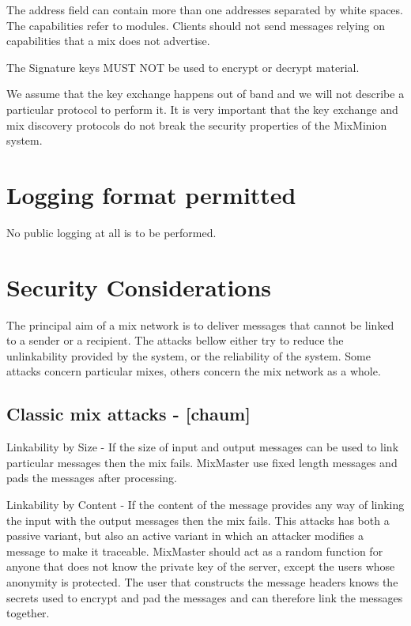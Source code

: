 \documentclass{article}
\begin{document}
The address field can contain more than one addresses separated by
white spaces. The capabilities refer to modules. Clients should not 
send messages relying on capabilities that a mix does not advertise.

The Signature keys MUST NOT be used to encrypt or decrypt material.

We assume that the key exchange happens out of band and we will not
describe a particular protocol to perform it. It is very important
that the key exchange and mix discovery protocols do not break the
security properties of the MixMinion system.

\section{Logging format permitted}

No public logging at all is to be performed.

\section{Security Considerations}

The principal aim of a mix network is
to deliver messages that cannot be linked to a sender or a
recipient. The attacks bellow either try to reduce the unlinkability
provided by the system, or the reliability of the system. Some
attacks concern particular mixes, others concern the mix network as a
whole.

\subsection{Classic mix attacks - [chaum]}

Linkability by Size - If the size of input and output messages can be
used to link particular messages then the mix fails. MixMaster use
fixed length messages and pads the messages after processing.

Linkability by Content - If the content of the message provides any
way of linking the input with the output messages then the mix
fails. This attacks has both a passive variant, but also an active
variant in which an attacker modifies a message to make it
traceable. MixMaster should act as a random function for anyone that
does not know the private key of the server, except the users whose
anonymity is protected. The user that constructs the message headers
knows the secrets used to encrypt and pad the messages and can
therefore link the messages together.
\end{document}
